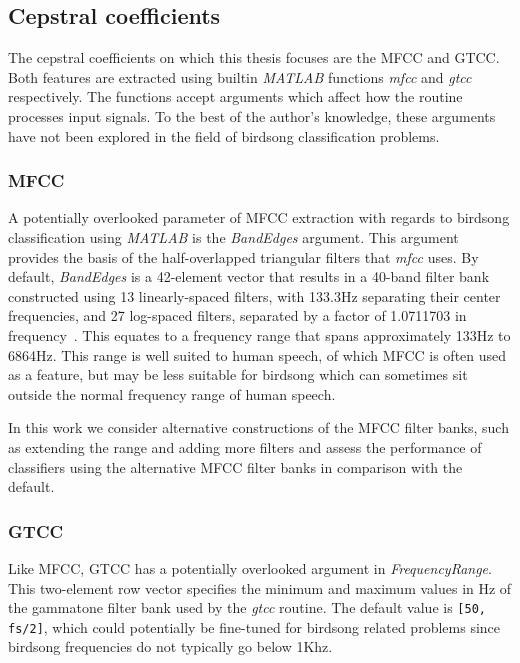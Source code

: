 \subsection{Cepstral coefficients}

The cepstral coefficients on which this thesis focuses are the MFCC and GTCC\@.
Both features are extracted using builtin \textit{MATLAB} functions
\textit{mfcc} and \textit{gtcc} respectively. The functions accept arguments
which affect how the routine processes input signals. To the best of the
author's knowledge, these arguments have not been explored in the field of
birdsong classification problems.

\subsubsection{MFCC}\label{sssec:mfcc}

A potentially overlooked parameter of MFCC extraction with regards to birdsong
classification using \textit{MATLAB} is the \textit{BandEdges} argument. This
argument provides the basis of the half-overlapped triangular filters that
\textit{mfcc} uses. By default, \textit{BandEdges} is a 42-element vector that
results in a 40-band filter bank constructed using 13 linearly-spaced filters,
with 133.3Hz separating their center frequencies, and 27 log-spaced filters,
separated by a factor of 1.0711703 in frequency~\cite{slaney1998auditory}. This
equates to a frequency range that spans approximately 133Hz to 6864Hz. This
range is well suited to human speech, of which MFCC is often used as a feature,
but may be less suitable for birdsong which can sometimes sit outside the normal
frequency range of human speech.

In this work we consider alternative constructions of the MFCC filter banks,
such as extending the range and adding more filters and assess the performance
of classifiers using the alternative MFCC filter banks in comparison with the
default.

\subsubsection{GTCC}\label{sssec:gtcc}

Like MFCC, GTCC has a potentially overlooked argument in
\textit{FrequencyRange}. This two-element row vector specifies the minimum and
maximum values in Hz of the gammatone filter bank used by the \textit{gtcc}
routine. The default value is \texttt{[50, fs/2]}, which could potentially be
fine-tuned for birdsong related problems since birdsong frequencies do not
typically go below 1Khz.

